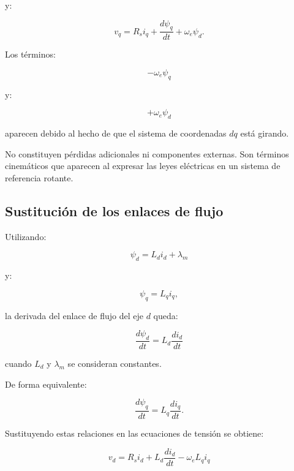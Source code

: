 y:

\begin{equation}
v_q
=
R_si_q
+
\frac{d\psi_q}{dt}
+
\omega_e\psi_d.
\end{equation}

Los términos:

\begin{equation}
-\omega_e\psi_q
\end{equation}

y:

\begin{equation}
+\omega_e\psi_d
\end{equation}

aparecen debido al hecho de que el sistema de coordenadas $dq$ está girando.

No constituyen pérdidas adicionales ni componentes externas. Son términos cinemáticos que aparecen al expresar las leyes eléctricas en un sistema de referencia rotante.

\subsection{Sustitución de los enlaces de flujo}

Utilizando:

\begin{equation}
\psi_d=L_di_d+\lambda_m
\end{equation}

y:

\begin{equation}
\psi_q=L_qi_q,
\end{equation}

la derivada del enlace de flujo del eje $d$ queda:

\begin{equation}
\frac{d\psi_d}{dt}
=
L_d\frac{di_d}{dt}
\end{equation}

cuando $L_d$ y $\lambda_m$ se consideran constantes.

De forma equivalente:

\begin{equation}
\frac{d\psi_q}{dt}
=
L_q\frac{di_q}{dt}.
\end{equation}

Sustituyendo estas relaciones en las ecuaciones de tensión se obtiene:

\begin{equation}
v_d
=
R_si_d
+
L_d\frac{di_d}{dt}
-
\omega_eL_qi_q
\end{equation}

